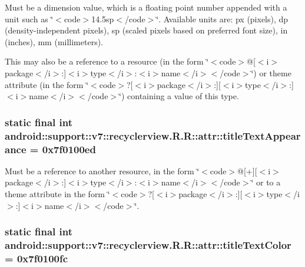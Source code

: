 Must be a dimension value, which is a floating point number appended with a unit such as \char`\"{}$<$code$>$14.5sp$<$/code$>$\char`\"{}. Available units are: px (pixels), dp (density-independent pixels), sp (scaled pixels based on preferred font size), in (inches), mm (millimeters). 

This may also be a reference to a resource (in the form \char`\"{}$<$code$>$@\mbox{[}$<$i$>$package$<$/i$>$:\mbox{]}$<$i$>$type$<$/i$>$:$<$i$>$name$<$/i$>$$<$/code$>$\char`\"{}) or theme attribute (in the form \char`\"{}$<$code$>$?\mbox{[}$<$i$>$package$<$/i$>$:\mbox{]}\mbox{[}$<$i$>$type$<$/i$>$:\mbox{]}$<$i$>$name$<$/i$>$$<$/code$>$\char`\"{}) containing a value of this type. \hypertarget{classandroid_1_1support_1_1v7_1_1recyclerview_1_1_r_1_1attr_05ccd4ebfaa0eb88fb8905c7ce8ca631}{
\subsubsection[{titleTextAppearance}]{\setlength{\rightskip}{0pt plus 5cm}static final int android::support::v7::recyclerview.R.R::attr::titleTextAppearance = 0x7f0100ed}}
\label{classandroid_1_1support_1_1v7_1_1recyclerview_1_1_r_1_1attr_05ccd4ebfaa0eb88fb8905c7ce8ca631}


Must be a reference to another resource, in the form \char`\"{}$<$code$>$@\mbox{[}+\mbox{]}\mbox{[}$<$i$>$package$<$/i$>$:\mbox{]}$<$i$>$type$<$/i$>$:$<$i$>$name$<$/i$>$$<$/code$>$\char`\"{} or to a theme attribute in the form \char`\"{}$<$code$>$?\mbox{[}$<$i$>$package$<$/i$>$:\mbox{]}\mbox{[}$<$i$>$type$<$/i$>$:\mbox{]}$<$i$>$name$<$/i$>$$<$/code$>$\char`\"{}. \hypertarget{classandroid_1_1support_1_1v7_1_1recyclerview_1_1_r_1_1attr_19b8b19ceb993d02150f5f8a10beddab}{
\subsubsection[{titleTextColor}]{\setlength{\rightskip}{0pt plus 5cm}static final int android::support::v7::recyclerview.R.R::attr::titleTextColor = 0x7f0100fc}}
\label{classandroid_1_1support_1_1v7_1_1recyclerview_1_1_r_1_1attr_19b8b19ceb993d02150f5f8a10beddab}


